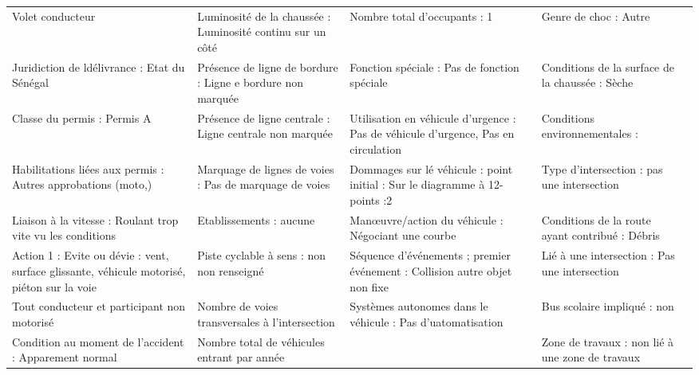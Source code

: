 \documentclass[a4paper,12pt,twoside,french]{book}
[a4paper,12pt,twoside]
\begin{document}
\begin{landscape}
\begin{table}[]
\begin{adjustbox}{width=2.1\textwidth,center=\textwidth}
\begin{tabular}{|l|l|l|l|l}
{\color[HTML]{196B24} Volet conducteur}                                                      & Luminosité de la chaussée : Luminosité continu sur un côté & Nombre total d'occupants : 1                                                        & Genre de choc : Autre                                 &  \\
Juridiction de ldélivrance : Etat du   Sénégal                                               & Présence de ligne de bordure : Ligne e bordure non marquée & Fonction spéciale : Pas de fonction spéciale                                        & Conditions de la surface de la chaussée : Sèche       &  \\
Classe du permis : Permis A                                                                  & Présence de ligne centrale : Ligne centrale non marquée    & Utilisation en véhicule d’urgence : Pas de véhicule d’urgence, Pas en   circulation & Conditions environnementales :                        &  \\
Habilitations liées aux permis : Autres   approbations (moto,)                               & Marquage de lignes de voies : Pas de marquage de voies     & Dommages sur lé véhicule : point initial : Sur le diagramme à 12-points   :2        & Type d'intersection : pas une intersection            &  \\
Liaison à la vitesse : Roulant trop vite   vu les conditions                                 & Etablissements : aucune                                    & Manœuvre/action du véhicule : Négociant une courbe                                  & Conditions de la route ayant contribué : Débris       &  \\
Action 1 : Evite ou dévie : vent, surface   glissante, véhicule motorisé, piéton sur la voie & Piste cyclable à sens : non  non   renseigné               & Séquence d'événements ; premier événement : Collision autre objet non   fixe        & Lié à une intersection : Pas une intersection         &  \\
{\color[HTML]{196B24} Tout conducteur et participant   non motorisé}                         & Nombre de voies transversales à l’intersection             & Systèmes autonomes dans le véhicule : Pas d'uatomatisation                          & Bus scolaire impliqué : non                           &  \\
Condition au moment de l'accident :   Apparement normal                                      & Nombre total de véhicules entrant par année                &                                                                                     & Zone de travaux  : non lié à une   zone de travaux    &  \\

\end{tabular}
\end{adjustbox}
\end{table}
\end{landscape}
\end{document}
